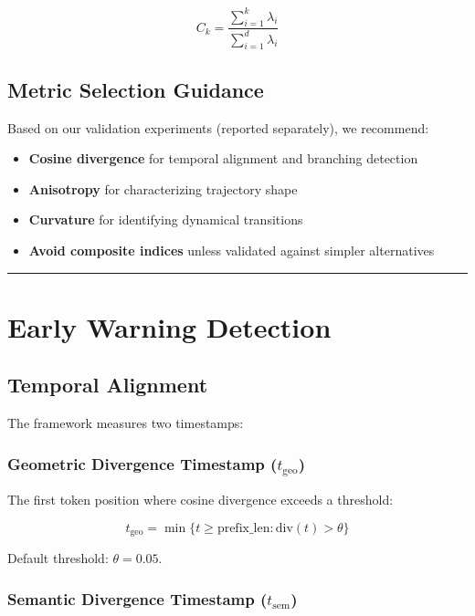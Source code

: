 \documentclass[12pt,a4paper]{article}
\begin{document}
\begin{equation}
C_k = \frac{\sum_{i=1}^k \lambda_i}{\sum_{i=1}^d \lambda_i}
\end{equation}

\subsection{Metric Selection Guidance}

Based on our validation experiments (reported separately), we recommend:

\begin{itemize}
    \item \textbf{Cosine divergence} for temporal alignment and branching detection
    \item \textbf{Anisotropy} for characterizing trajectory shape
    \item \textbf{Curvature} for identifying dynamical transitions
    \item \textbf{Avoid composite indices} unless validated against simpler alternatives
\end{itemize}

\medskip
\hrule
\medskip

\section{Early Warning Detection}

\subsection{Temporal Alignment}

The framework measures two timestamps:

\subsubsection*{Geometric Divergence Timestamp (\(t_{\text{geo}}\))}

The first token position where cosine divergence exceeds a threshold:

\begin{equation}
t_{\text{geo}} = \min\{t \geq \text{prefix\_len} : \text{div}(t) > \theta\}
\end{equation}

Default threshold: \(\theta = 0.05\).

\subsubsection*{Semantic Divergence Timestamp (\(t_{\text{sem}}\))}
\end{document}
